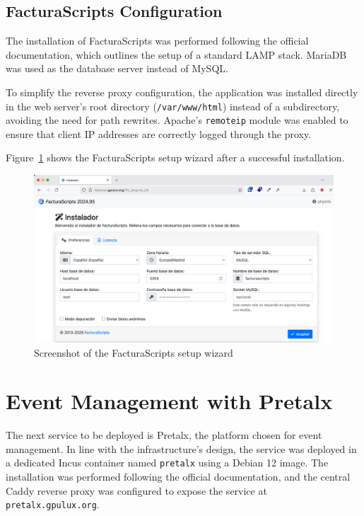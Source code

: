 \subsection*{FacturaScripts Configuration}

The installation of FacturaScripts was performed following the official documentation\cite{facturascripts-install-linux}, which outlines the setup of a standard LAMP stack. MariaDB was used as the database server instead of MySQL.

To simplify the reverse proxy configuration, the application was installed directly in the web server's root directory (\texttt{/var/www/html}) instead of a subdirectory, avoiding the need for path rewrites. Apache's \texttt{remoteip} module was enabled to ensure that client IP addresses are correctly logged through the proxy.

Figure~\ref{fig:facturascripts-wizard} shows the FacturaScripts setup wizard after a successful installation.

\begin{figure}[H]
	\centering
	\includegraphics[width=\textwidth]{imaxes/facturascripts-wizard.png}
       \caption{Screenshot of the FacturaScripts setup wizard}
	\label{fig:facturascripts-wizard}
\end{figure}

\section{Event Management with Pretalx}

The next service to be deployed is Pretalx, the platform chosen for event management. In line with the infrastructure's design, the service was deployed in a dedicated Incus container named \texttt{pretalx} using a Debian 12 image. The installation was performed following the official documentation\cite{pretalx-install}, and the central Caddy reverse proxy was configured to expose the service at \texttt{pretalx.gpulux.org}.

